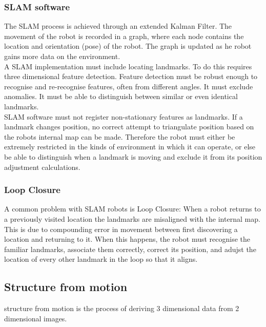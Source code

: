 \documentclass{article}
\begin{document}
		\subsubsection{SLAM software}
		The SLAM process is achieved through an extended Kalman Filter. The movement of the robot is recorded in a graph, where each node contains the location and orientation (pose) of the robot. The graph is updated as he robot gains more data on the environment\cite{grisetti2010tutorial}.
		\\A SLAM implementation must include locating landmarks. To do this requires three dimensional feature detection. Feature detection must be robust enough to recognise and re-recognise features, often from different angles. It must exclude anomalies. It must be able to distinguish between similar or even identical landmarks. 
		\\SLAM  software must not register non-stationary features as landmarks. If a landmark changes position, no correct attempt to triangulate position based on the robots internal map can be made. Therefore the robot must either be extremely restricted in the kinds of environment in which it can operate, or else be able to distinguish when a landmark is moving and exclude it from its position adjustment calculations.
		\subsubsection{Loop Closure}
		A common problem with SLAM robots is Loop Closure: When a robot returns to a previously visited location the landmarks are misaligned with the internal map. This is due to compounding error in movement between first discovering a location and returning to it. When this happens, the robot must recognise the familiar landmarks, associate them correctly, correct its position, and adujst the location of every other landmark in the loop so that it aligns.
		
	\subsection{Structure from motion}
	structure from motion is the process of deriving 3 dimensional data from 2 dimensional images.
\end{document}
